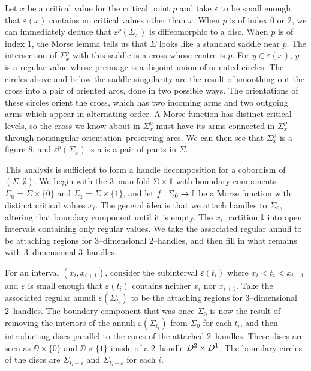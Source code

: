 Let $x$ be a critical value for the critical point $p$ and take $\varepsilon$ to be small enough that $\varepsilon(x)$ contains no critical values other than $x$.
When $p$ is of index 0 or 2, we can immediately deduce that $\varepsilon^p(\Sigma_x)$ is diffeomorphic to a disc.
When $p$ is of index 1, the Morse lemma tells us that $\Sigma$ looks like a standard saddle near $p$.
The intersection of $\Sigma_x^p$ with this saddle is a cross whose centre is $p$.
For $y\in\varepsilon(x)$, $y$ is a regular value whose preimage is a disjoint union of oriented circles.
The circles above and below the saddle singularity are the result of smoothing out the cross into a pair of oriented arcs, done in two possible ways.
The orientations of these circles orient the cross, which has two incoming arms and two outgoing arms which appear in alternating order.
A Morse function has distinct critical levels, so the cross we know about in $\Sigma_x^p$ must have its arms connected in $\Sigma_x^p$ through nonsingular orientation--preserving arcs.
We can then see that $\Sigma_x^p$ is a figure 8, and $\varepsilon^p(\Sigma_x)$ is a is a pair of pants in $\Sigma$.

This analysis is sufficient to form a handle decomposition for a cobordism of $(\Sigma,\emptyset)$.
We begin with the 3--manifold $\Sigma\times\mathbb{I}$ with boundary components $\Sigma_0=\Sigma\times\{0\}$ and $\Sigma_1=\Sigma\times\{1\}$, and let $f:\Sigma_0\to\mathbb{I}$ be a Morse function with distinct critical values $x_i$.
The general idea is that we attach handles to $\Sigma_0$, altering that boundary component until it is empty.
The $x_i$ partition $\mathbb{I}$ into open intervals containing only regular values.
We take the associated regular annuli to be attaching regions for 3--dimensional 2--handles, and then fill in what remains with 3--dimensional 3--handles.

For an interval $(x_i,x_{i+1})$, consider the subinterval $\varepsilon(t_i)$ where $x_i<t_i<x_{i+1}$ and $\varepsilon$ is small enough that $\varepsilon(t_i)$ contains neither $x_i$ nor $x_{i+1}$.
Take the associated regular annuli $\varepsilon(\Sigma_{t_i})$ to be the attaching regions for 3--dimensional 2--handles.
The boundary component that was once $\Sigma_0$ is now the result of removing the interiors of the annuli $\varepsilon(\Sigma_{t_i})$ from $\Sigma_0$ for each $t_i$, and then introducting discs parallel to the cores of the attached 2--handles.
These discs are seen as $\DD\times\{0\}$ and $\DD\times\{1\}$ inside of a 2--handle $D^2\times D^1$.
The boundary circles of the discs are $\Sigma_{t_i-\varepsilon}$ and $\Sigma_{t_i+\varepsilon}$ for each $i$.

